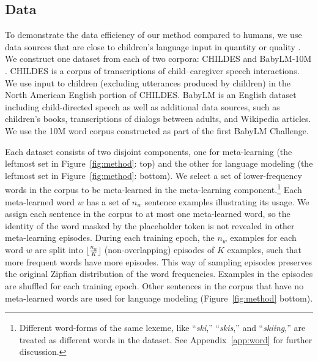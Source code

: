 \documentclass{article}
\begin{document}
\subsection{Data}
\label{sec:dataset}

To demonstrate the data efficiency of our method compared to humans, we use data sources that are close to children's language input in quantity or quality \citep{BabyLM}.
We construct one dataset from each of two corpora: CHILDES \citep{CHILDES} and BabyLM-10M \citep{BabyLM}.
CHILDES is a corpus of transcriptions of child--caregiver speech interactions. We use input to children (excluding utterances produced by children) in the North American English portion of CHILDES.
BabyLM is an English dataset including child-directed speech as well as additional data sources, such as children's books, transcriptions of dialogs between adults, and Wikipedia articles. We use the 10M word corpus constructed as part of the first BabyLM Challenge.

Each dataset consists of two disjoint components, one for meta-learning (the leftmost set in Figure~\ref{fig:method}: top) and the other for language modeling (the leftmost set in Figure~\ref{fig:method}: bottom).
We select a set of lower-frequency words in the corpus to be meta-learned in the meta-learning component.\footnote{Different word-forms of the same lexeme, like ``\emph{ski},'' ``\emph{skis},'' and ``\emph{skiing},'' are treated as different words in the dataset. See Appendix~\ref{app:word} for further discussion.}
Each meta-learned word $w$ has a set of $n_w$ sentence examples illustrating its usage.
We assign each sentence in the corpus to at most one meta-learned word, so the identity of the word masked by the placeholder token is not revealed in other meta-learning episodes.
During each training epoch, the $n_w$ examples for each word $w$ are split into $\lfloor\frac{n_w}{K}\rfloor$ (non-overlapping) episodes of $K$ examples, such that more frequent words have more episodes. This way of sampling episodes preserves the original Zipfian distribution of the word frequencies. Examples in the episodes are shuffled for each training epoch.
Other sentences in the corpus that have no meta-learned words are used for language modeling (Figure~\ref{fig:method} bottom).
\end{document}
